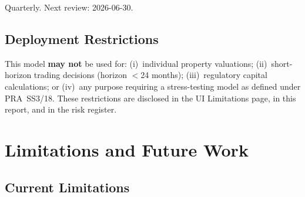 \documentclass[11pt,a4paper]{article}
\theoremstyle{plain}
\theoremstyle{definition}
\begin{document}
Quarterly.  Next review: 2026-06-30.

\subsection{Deployment Restrictions}

\begin{govbox}
This model \textbf{may not} be used for: (i)~individual property
valuations; (ii)~short-horizon trading decisions (horizon $<$24 months);
(iii)~regulatory capital calculations; or (iv)~any purpose requiring a
stress-testing model as defined under PRA~SS3/18.  These restrictions are
disclosed in the UI Limitations page, in this report, and in the risk
register.
\end{govbox}

\section{Limitations and Future Work}

\subsection{Current Limitations}
\end{document}
